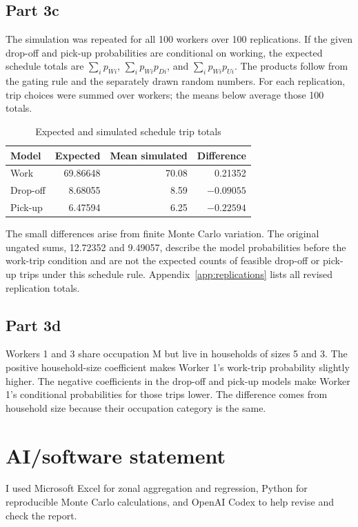 \documentclass[11pt]{article}
\begin{document}
\subsection{Part 3c}
The simulation was repeated for all 100 workers over 100 replications. If the given drop-off and pick-up probabilities are conditional on working, the expected schedule totals are $\sum_i p_{Wi}$, $\sum_i p_{Wi}p_{Di}$, and $\sum_i p_{Wi}p_{Ui}$. The products follow from the gating rule and the separately drawn random numbers. For each replication, trip choices were summed over workers; the means below average those 100 totals.
\begin{table}[H]\centering\caption{Expected and simulated schedule trip totals}\begin{tabular}{lrrr}\toprule
Model & Expected & Mean simulated & Difference\\\midrule
Work & 69.86648 & 70.08 & 0.21352\\
Drop-off & 8.68055 & 8.59 & $-0.09055$\\
Pick-up & 6.47594 & 6.25 & $-0.22594$\\\bottomrule\end{tabular}\end{table}
The small differences arise from finite Monte Carlo variation. The original ungated sums, 12.72352 and 9.49057, describe the model probabilities before the work-trip condition and are not the expected counts of feasible drop-off or pick-up trips under this schedule rule. Appendix~\ref{app:replications} lists all revised replication totals.
\subsection{Part 3d}
Workers 1 and 3 share occupation M but live in households of sizes 5 and 3. The positive household-size coefficient makes Worker 1's work-trip probability slightly higher. The negative coefficients in the drop-off and pick-up models make Worker 1's conditional probabilities for those trips lower. The difference comes from household size because their occupation category is the same.
\section*{AI/software statement}
I used Microsoft Excel for zonal aggregation and regression, Python for reproducible Monte Carlo calculations, and OpenAI Codex to help revise and check the report.
\appendix
\end{document}
